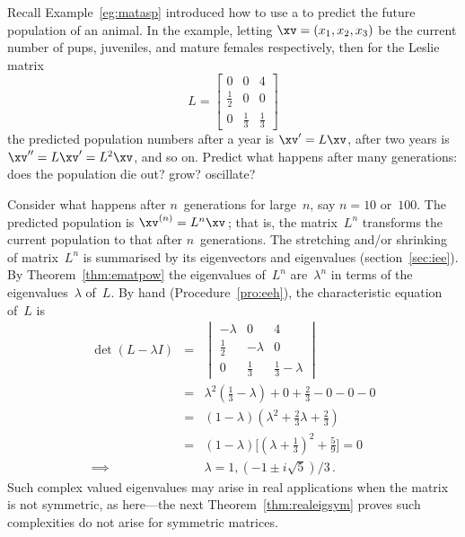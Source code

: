 \begin{example} \label{eg:ltas}
Recall Example~\ref{eg:matasp} introduced how to use a  to predict the future population of an animal.
In the example, letting \(\xv=(x_1,x_2,x_3)\) be the current number of pups, juveniles, and mature females respectively, then for the Leslie matrix
\begin{equation*}
L=\begin{bmatrix} 0&0&4\\\frac12&0&0\\0&\frac13&\frac13 \end{bmatrix}
\end{equation*} 
the predicted population numbers after a year is \(\xv'=L\xv\), after two years is \(\xv''=L\xv'=L^2\xv\), and so on.
Predict what happens after many generations: does the population die out? grow? oscillate? 
\begin{solution} 
Consider what happens after \(n\)~generations for large~\(n\), say \(n=10\) or~\(100\).
The predicted population is \(\xv^{(n)}=L^n\xv\)\,; that is, the matrix~\(L^n\) transforms the current population to that after \(n\)~generations.
The stretching and/or shrinking of matrix~\(L^n\) is summarised by its eigenvectors and eigenvalues (section~\ref{sec:iee}).
By Theorem~\ref{thm:ematpow} the eigenvalues of~\(L^n\) are~\(\lambda^n\) in terms of the eigenvalues~\(\lambda\) of~\(L\).
By hand (Procedure~\ref{pro:eeh}), the characteristic equation of~\(L\) is
\begin{eqnarray*}
\det(L-\lambda I)
&=&\begin{vmatrix} -\lambda&0&4\\\frac12&-\lambda&0\\0&\frac13&\frac13-\lambda \end{vmatrix}
\\&=&\lambda^2(\tfrac13-\lambda)+0+\tfrac23-0-0-0
\\&=&(1-\lambda)(\lambda^2 +\tfrac23\lambda+\tfrac23)
\\&=&(1-\lambda)\big[(\lambda+\tfrac13)^2+\tfrac59\big]=0
\\\implies&&\lambda=1,(-1\pm i\sqrt5)/3\,.
\end{eqnarray*}
Such complex valued eigenvalues may arise in real applications when the matrix is not symmetric, as here---the next Theorem~\ref{thm:realeigsym} proves such complexities do not arise for symmetric matrices.


\end{solution}
\end{example}
